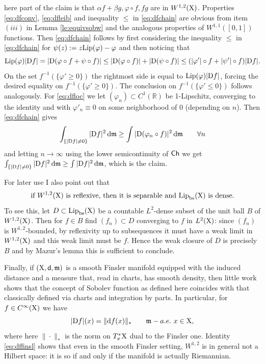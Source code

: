 \documentclass[11pt]{article}
\numberwithin{equation}{section}
\newcommand{\R}{\mathbb{R}}
\newcommand{\X}{{\rm X}}
\newcommand{\sfd}{{\sf d}}
\newcommand{\mm}{{\mathfrak m}}
\newcommand{\ch}{{\sf Ch}}
\renewcommand{\d}{{\rm d}}
\newcommand{\D}{{\rm D}}
\newcommand{\Lip}{{\rm Lip}}
\newcommand{\bs}{{\rm bs}}
\begin{document}
here part of the claim is that $\alpha f+\beta g,\varphi\circ f,fg$ are in $W^{1,2}(\X)$. Properties  \eqref{eq:dfconv}, \eqref{eq:dfleib} and inequality $\leq$ in \eqref{eq:dfchain}  are obvious from item $(iii)$ in Lemma \eqref{le:equivsobw} and the analogous properties of $W^{1,1}([0,1])$ functions. Then  \eqref{eq:dfchain}  follows by first considering the inequality $\leq $ in \eqref{eq:dfchain} for $\psi(z):=z\Lip(\varphi)-\varphi$ and then noticing that
\[
\Lip(\varphi)|\D f|=|\D(\varphi \circ f+\psi\circ f)|\leq|\D (\varphi\circ f)|+|\D (\psi\circ f)|\leq (|\varphi'|\circ f+|\psi'|\circ f)|\D f|.
\]
On the set $f^{-1}(\{\varphi'\geq 0\})$ the rightmost side is equal to $\Lip(\varphi)|\D f|$, forcing the desired equality on $f^{-1}(\{\varphi'\geq 0\})$. The conclusion on $f^{-1}(\{\varphi'\leq 0\})$ follows analogously. For \eqref{eq:dfloc} we let $(\varphi_n)\subset C^1(\R)$ be 1-Lipschitz, converging to the identity and with $\varphi'_n\equiv0$ on some neighborhood of 0 (depending on $n$). Then \eqref{eq:dfchain} gives
\[
\int_{\{|\D f|\neq 0\}}|\D f|^2\,\d\mm\geq\int |\D(\varphi_n\circ f)|^2\,\d\mm\qquad\forall n
\]
and letting $n\to\infty$ using the lower semicontinuity of $\ch$ we get $\int_{\{|\D f|\neq 0\}}|\D f|^2\,\d\mm\geq \int|\D f|^2\,\d\mm$, which is the claim. 

 For later use I also point out that
\begin{equation}
\label{eq:w12reflsep}
\text{if $W^{1,2}(\X)$ is reflexive, then it is separable and $\Lip_\bs(\X)$ is dense.}
\end{equation}
To see this, let $D\subset \Lip_\bs(\X)$  be a countable $L^2$-dense subset of the unit ball $B$ of $W^{1,2}(\X)$. Then for $f\in B$ find $(f_n) \subset D$ converging to $f$ in $L^2(\X)$: since $(f_n)$ is $W^{1,2}$-bounded, by reflexivity up to subsequences it must have a weak limit in $W^{1,2}(\X)$ and this weak limit must be $f$. Hence the weak closure of $D$ is precisely $B$ and by Mazur’s lemma this is sufficient to conclude.



Finally,  if $(\X,\sfd,\mm)$ is a smooth Finsler manifold equipped with the induced distance and a measure that, read in charts, has smooth density, then little work shows that  the concept of Sobolev function as defined here coincides with that classically defined via charts and integration by parts. In particular, for $f\in C^\infty(\X)$ we have
\begin{equation}
\label{eq:dffinsl}
|\D f|(x)=\| \d f(x)\|_*\qquad\mm-a.e.\ x\in\X,
\end{equation}
where here $\| \cdot\|_*$ is the norm on $T^*_x\X$ dual to the Finsler one. Identity \eqref{eq:dffinsl} shows that even in the smooth Finsler setting, $W^{1,2}$ is in general {not} a Hilbert space: it is so if and only if the manifold is actually Riemannian.
\end{document}
